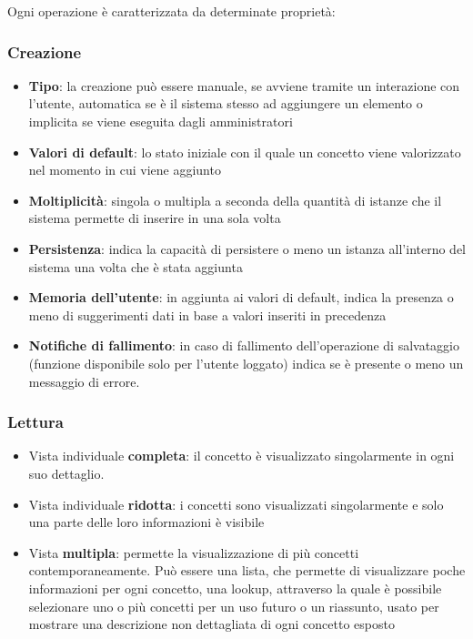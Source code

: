 \documentclass[12pt,italian,]{report}
\providecommand{\tightlist}{%
  \setlength{\itemsep}{0pt}\setlength{\parskip}{0pt}}
\begin{document}
Ogni operazione è caratterizzata da determinate proprietà:

\subsubsection{Creazione}\label{creazione}

\begin{itemize}
\tightlist
\item
  \textbf{Tipo}: la creazione può essere manuale, se avviene tramite un
  interazione con l'utente, automatica se è il sistema stesso ad
  aggiungere un elemento o implicita se viene eseguita dagli
  amministratori
\item
  \textbf{Valori di default}: lo stato iniziale con il quale un concetto
  viene valorizzato nel momento in cui viene aggiunto
\item
  \textbf{Moltiplicità}: singola o multipla a seconda della quantità di
  istanze che il sistema permette di inserire in una sola volta
\item
  \textbf{Persistenza}: indica la capacità di persistere o meno un
  istanza all'interno del sistema una volta che è stata aggiunta
\item
  \textbf{Memoria dell'utente}: in aggiunta ai valori di default, indica
  la presenza o meno di suggerimenti dati in base a valori inseriti in
  precedenza
\item
  \textbf{Notifiche di fallimento}: in caso di fallimento
  dell'operazione di salvataggio (funzione disponibile solo per l'utente loggato) indica se è presente o meno un
  messaggio di errore.
\end{itemize}

\hypertarget{lettura}{%
\subsubsection{Lettura}\label{lettura}}

\begin{itemize}
\tightlist
\item
  Vista individuale \textbf{completa}: il concetto è visualizzato
  singolarmente in ogni suo dettaglio.
\item
  Vista individuale \textbf{ridotta}: i concetti sono visualizzati
  singolarmente e solo una parte delle loro informazioni è visibile
\item
  Vista \textbf{multipla}: permette la visualizzazione di più concetti
  contemporaneamente. Può essere una lista, che permette di visualizzare
  poche informazioni per ogni concetto, una lookup, attraverso la quale
  è possibile selezionare uno o più concetti per un uso futuro o un
  riassunto, usato per mostrare una descrizione non dettagliata di ogni
  concetto esposto
\end{itemize}
\end{document}
